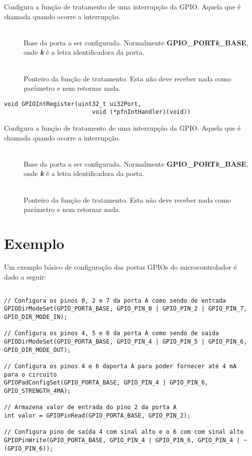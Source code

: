 Configura a função de tratamento de uma interrupção da GPIO. Aquela que é chamada quando ocorre a interrupção.

\begin{description}
	\item []\hfill \\
	Base da porta a ser configurada. Normalmente \textbf{GPIO\_PORT\emph{k}\_BASE}, onde \textbf{\emph{k}} é a letra identificadora da porta.
	
	\item []\hfill \\
	Ponteiro da função de tratamento. Esta não deve receber nada como parâmetro e nem retornar nada.
\end{description}

\begin{lstlisting}[style=funcao]
	void GPIOIntRegister(uint32_t ui32Port,
						 void (*pfnIntHandler)(void))
\end{lstlisting}

Configura a função de tratamento de uma interrupção da GPIO. Aquela que é chamada quando ocorre a interrupção.

\begin{description}
	\item []\hfill \\
	Base da porta a ser configurada. Normalmente \textbf{GPIO\_PORT\emph{k}\_BASE}, onde \textbf{\emph{k}} é a letra identificadora da porta.
	
	\item []\hfill \\
	Ponteiro da função de tratamento. Esta não deve receber nada como parâmetro e nem retornar nada.
\end{description}

\section{Exemplo}

Um exemplo básico de configuração das portas GPIOs do microcontrolador é dado a seguir:

\begin{lstlisting}[style=citacao]

// Configura os pinos 0, 2 e 7 da porta A como sendo de entrada
GPIODirModeSet(GPIO_PORTA_BASE, GPIO_PIN_0 | GPIO_PIN_2 | GPIO_PIN_7, GPIO_DIR_MODE_IN);

// Configura os pinos 4, 5 e 6 da porta A como sendo de saida
GPIODirModeSet(GPIO_PORTA_BASE, GPIO_PIN_4 | GPIO_PIN_5 | GPIO_PIN_6, GPIO_DIR_MODE_OUT);

// Configura os pinos 4 e 6 daporta A para poder fornecer até 4 mA para o circuito
GPIOPadConfigSet(GPIO_PORTA_BASE, GPIO_PIN_4 | GPIO_PIN_6, GPIO_STRENGTH_4MA);

// Armazena valor de entrada do pino 2 da porta A
int valor = GPIOPinRead(GPIO_PORTA_BASE, GPIO_PIN_2);

// Configura pino de saída 4 com sinal alto e o 6 com com sinal alto
GPIOPinWrite(GPIO_PORTA_BASE, GPIO_PIN_4 | GPIO_PIN_6, GPIO_PIN_4 | ~(GPIO_PIN_6));

\end{lstlisting}


